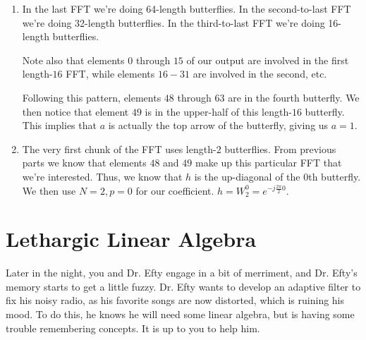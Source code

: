 \documentclass{article}
\begin{document}
\begin{enumerate}
    \item In the last FFT we're doing 64-length butterflies. In the second-to-last FFT we're doing 32-length butterflies. In the third-to-last FFT we're doing 16-length butterflies.
    
    Note also that elements $0$ through $15$ of our output are involved in the first length-$16$ FFT, while elements $16-31$ are involved in the second, etc.
    
    Following this pattern, elements $48$ through $63$ are in the fourth butterfly. We then notice that element $49$ is in the upper-half of this length-$16$ butterfly. This implies that $a$ is actually the top arrow of the butterfly, giving us $\boxed{a = 1}$.
    
    \item The very first chunk of the FFT uses length-$2$ butterflies. From previous parts we know that elements $48$ and $49$ make up this particular FFT that we're interested. Thus, we know that $h$ is the up-diagonal of the $0$th butterfly. We then use $N = 2, p = 0$ for our coefficient. $\boxed{h = W_{2}^0 = e^{-j \frac{2\pi}{2} 0}}$.
\end{enumerate}

\newpage


\section{Lethargic Linear Algebra}

Later in the night, you and Dr. Efty engage in a bit of merriment, and Dr. Efty's memory starts to get a little fuzzy. Dr. Efty wants to develop an adaptive filter to fix his noisy radio, as his favorite songs are now distorted, which is ruining his mood. To do this, he knows he will need some linear algebra, but is having some trouble remembering concepts. It is up to you to help him.
\end{document}
